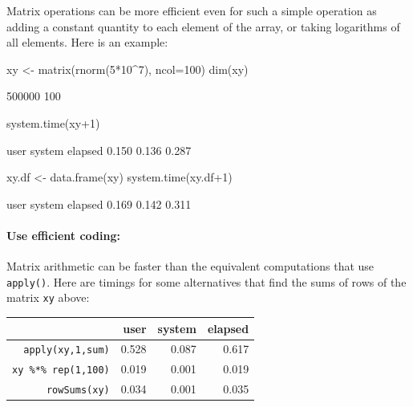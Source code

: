 \documentclass{tufte-book}\usepackage[]{graphicx}\usepackage[]{color}
\newcommand{\txtt}[1]{\texttt{#1}}
\begin{document}
Matrix operations can be more efficient even for such a simple
operation as adding a constant quantity to each element of the array,
or taking logarithms of all elements.  Here is an
example:
\begin{Schunk}
\begin{Sinput}
xy <- matrix(rnorm(5*10^7), ncol=100)
dim(xy)
\end{Sinput}
\begin{Soutput}
[1] 500000    100
\end{Soutput}
\end{Schunk}
\begin{Schunk}
\begin{Sinput}
system.time(xy+1)
\end{Sinput}
\begin{Soutput}
   user  system elapsed 
  0.150   0.136   0.287 
\end{Soutput}
\begin{Sinput}
xy.df <- data.frame(xy)
system.time(xy.df+1)
\end{Sinput}
\begin{Soutput}
   user  system elapsed 
  0.169   0.142   0.311 
\end{Soutput}
\end{Schunk}
\vspace*{-12pt}

\paragraph{Use efficient coding:}
Matrix arithmetic can be faster than the equivalent computations
that use \txtt{apply()}. Here are timings for some alternatives that
find the sums of rows of the matrix \txtt{xy} above:\\[-4pt]

\begin{center}
\begin{tabular}{rrrr}
  \hline
 & user & system & elapsed \\
  \hline
\txtt{apply(xy,1,sum)}      & 0.528 & 0.087 & 0.617 \\
 \txtt{xy \%*\% rep(1,100)} & 0.019 & 0.001 & 0.019 \\
 \txtt{rowSums(xy)}         & 0.034 & 0.001 & 0.035 \\
   \hline
\end{tabular}
\end{center}
\vspace*{-9pt}
\end{document}
